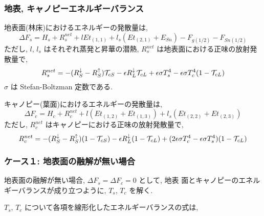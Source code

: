 \subsubsection{地表, キャノピーエネルギーバランス}

 地表面(林床)におけるエネルギーの発散量は, 
 \begin{equation}
 \Delta F_s =
  H_s + R^{net}_s + l Et_{(1,1)} + l_s ( Et_{(2,1)} + E_{Sn} )
  - F_{g(1/2)} - F_{Sn(1/2)} 
  \label{eb_start}
 \end{equation}
 ただし, $l$, $l_s$ はそれぞれ蒸発と昇華の潜熱, 
 $R^{net}_s$ は地表面における正味の放射発散量で, 
 \begin{equation}
  R^{net}_s = -(R^{\downarrow}_S - R^{\uparrow}_S) {\cal{T}}_{cS}
              - \epsilon R^{\downarrow}_L {\cal{T}}_{cL}
              + \epsilon \sigma T_s^4 
              - \epsilon \sigma T_c^4 (1 - {\cal{T}}_{cL})
 \end{equation}
 $\sigma$ は Stefan-Boltzman 定数である. 

 キャノピー(葉面)におけるエネルギーの発散量は, 
 \begin{equation}
  \Delta F_c =
  H_c + R^{net}_c + l ( Et_{(1,2)} + Et_{(1,3)} ) 
  + l_s ( Et_{(2,2)} + Et_{(2,3)} )
 \end{equation}
 ただし, $R^{net}_c$ はキャノピーにおける正味の放射発散量で, 
 \begin{equation}
  R^{net}_c = -(R^{\downarrow}_S - R^{\uparrow}_S) (1-{\cal{T}}_{cS})
              - \epsilon R^{\downarrow}_L (1-{\cal{T}}_{cL})
              + ( 2 \epsilon \sigma T_c^4 
              - \epsilon \sigma T_s^4 ) (1 - {\cal{T}}_{cL})
  \label{eb_end}
 \end{equation}

\subsubsection{ケース１: 地表面の融解が無い場合}

地表面の融解が無い場合, $\Delta F_s=\Delta F_c=0$ として, 地表
面とキャノピーのエネルギーバランスが成り立つように, $T_s$, $T_c$ を解く. 

$T_s$, $T_c$ について各項を線形化したエネルギーバランスの式は, 

